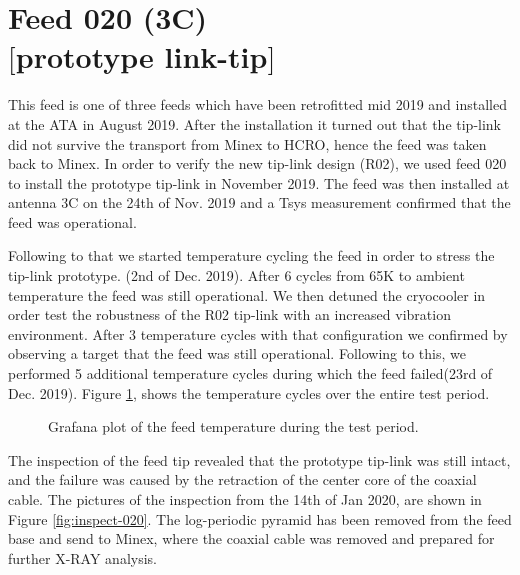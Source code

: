 \documentclass[12pt,a4paper,oneside]{article}
\begin{document}
\newpage
\section{Feed 020 (3C)\\$[$prototype link-tip$]$}
\label{sec:2}
This feed is one of three feeds which have been retrofitted mid 2019 and installed at the ATA in August 2019.
After the installation it turned out that the tip-link did not survive the transport from Minex to HCRO, hence the feed was taken back to Minex.
In order to verify the new tip-link design (R02), we used feed 020 to install the prototype tip-link in November 2019. The feed was then installed at
antenna 3C on the 24th of Nov. 2019 and a Tsys measurement confirmed that the feed was operational. 

Following to that we started temperature cycling the feed in order to stress the tip-link prototype. (2nd of Dec. 2019).
After 6 cycles from 65K to ambient temperature the feed was still operational. We then detuned the cryocooler in order 
test the robustness of the R02 tip-link with an increased vibration environment.  After 3 temperature cycles with that configuration
we confirmed by observing a target that the feed was still operational. Following to this, we performed 5 additional temperature cycles
during which the feed failed(23rd of Dec. 2019). Figure \ref{fig:temperature-cycle}, shows the temperature cycles over the entire test period. 
%
\begin{figure}[H]
\caption{Grafana plot of the feed temperature during the test period.}
\label{fig:temperature-cycle}
\end{figure}
%
The inspection of the feed tip revealed that the prototype tip-link was still intact, and the failure was caused by the retraction of the center core of the coaxial cable.
The pictures of the inspection from the 14th of Jan 2020, are shown in Figure \ref{fig:inspect-020}. The log-periodic pyramid has been removed from the feed base and send to Minex, where the coaxial cable was removed and prepared for further X-RAY analysis.
\end{document}
